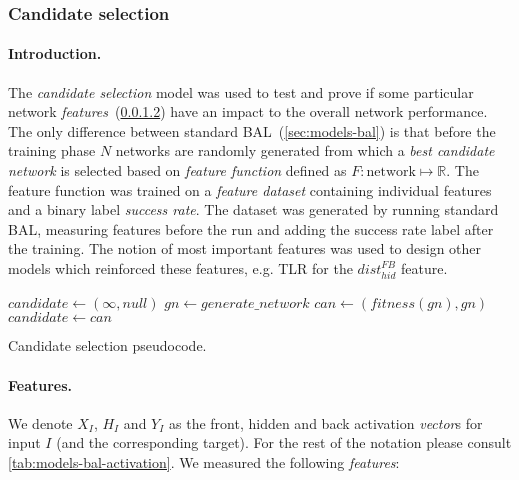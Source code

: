 \subsubsection{Candidate selection} 
\label{sec:sim-exp-candidates}

\paragraph{Introduction.} 
The \emph{candidate selection} model was used to test and prove if some particular network \emph{features}~(\ref{sec:our-candidates-features}) have an impact to the overall network performance. The only difference between standard BAL~(\ref{sec:models-bal}) is that before the training phase $N$ networks are randomly generated from which a \emph{best candidate network} is selected based on \emph{feature function} defined as $F: \mbox{network} \mapsto \mathbb{R}$. The feature function was trained on a \emph{feature dataset} containing individual features and a binary label \emph{success rate}. The dataset was generated by running standard BAL, measuring features before the run and adding the success rate label after the training. The notion of most important features was used to design other models which reinforced these features, e.g. TLR for the $dist_{hid}^{FB}$ feature. 

\begin{algorithm}[H]
  \begin{algorithmic}
    \State $candidate \gets (\infty, null)$
      \State $gn \gets generate\_network$
      \State $can \gets (fitness(gn), gn)$
        \State $candidate \gets can$
      \EndIf
    \EndFor
  \caption{Candidate selection pseudocode.}
  \label{alg:our-candidates-pseudocode} 
  \end{algorithmic}
\end{algorithm} 

\paragraph{Features.}
\label{sec:our-candidates-features}

We denote $X_I$, $H_I$ and $Y_I$ as the front, hidden and back activation \emph{vector}s for input $I$ (and the corresponding target). For the rest of the notation please consult \ref{tab:models-bal-activation}. We measured the following \emph{features}: 

